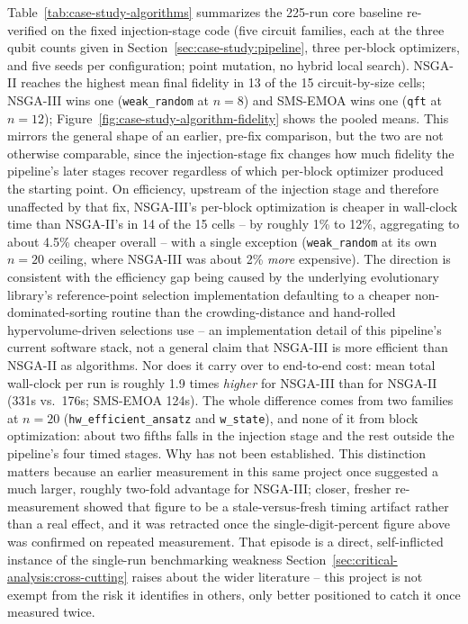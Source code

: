 Table~\ref{tab:case-study-algorithms} summarizes the 225-run core
baseline re-verified on the fixed injection-stage code (five circuit
families, each at the three qubit counts given in
Section~\ref{sec:case-study:pipeline}, three per-block optimizers, and
five seeds per configuration; point mutation, no hybrid local
search). NSGA-II reaches
the highest mean final fidelity in 13 of the 15 circuit-by-size cells;
NSGA-III wins one (\texttt{weak\_random} at $n{=}8$) and SMS-EMOA wins
one (\texttt{qft} at $n{=}12$); Figure~\ref{fig:case-study-algorithm-fidelity}
shows the pooled means. This mirrors the general shape of an
earlier, pre-fix comparison, but the two are not otherwise comparable,
since the injection-stage fix changes how much fidelity the pipeline's
later stages recover regardless of which per-block optimizer produced
the starting point. On efficiency, upstream of the injection stage and
therefore unaffected by that fix, NSGA-III's per-block optimization is
cheaper in wall-clock time than NSGA-II's in 14 of the 15 cells --
by roughly 1\% to 12\%, aggregating to about 4.5\% cheaper overall --
with a single exception (\texttt{weak\_random} at its own $n{=}20$
ceiling, where NSGA-III was about 2\% \emph{more} expensive). The
direction is consistent with the efficiency gap being caused by the
underlying evolutionary library's reference-point selection
implementation defaulting to a cheaper non-dominated-sorting routine
than the crowding-distance and hand-rolled hypervolume-driven selections
use -- an implementation detail of this pipeline's current software
stack, not a general claim that NSGA-III is more efficient than
NSGA-II as algorithms. Nor does it carry over to end-to-end cost: mean
total wall-clock per run is roughly 1.9 times \emph{higher} for NSGA-III
than for NSGA-II (331s vs.\ 176s; SMS-EMOA 124s). The whole difference
comes from two families at $n{=}20$ (\texttt{hw\_efficient\_ansatz} and
\texttt{w\_state}), and none of it from block optimization: about
two fifths falls in the injection stage and the rest outside the
pipeline's four timed stages. Why has not been established. This
distinction matters because an earlier
measurement in this same project once suggested a much larger, roughly
two-fold advantage for NSGA-III; closer, fresher re-measurement showed
that figure to be a stale-versus-fresh timing artifact rather than a
real effect, and it was retracted once the single-digit-percent figure
above was confirmed on repeated measurement. That episode is a direct,
self-inflicted instance of the single-run benchmarking weakness
Section~\ref{sec:critical-analysis:cross-cutting} raises about the wider
literature -- this project is not exempt from the risk it identifies in
others, only better positioned to catch it once measured twice.

